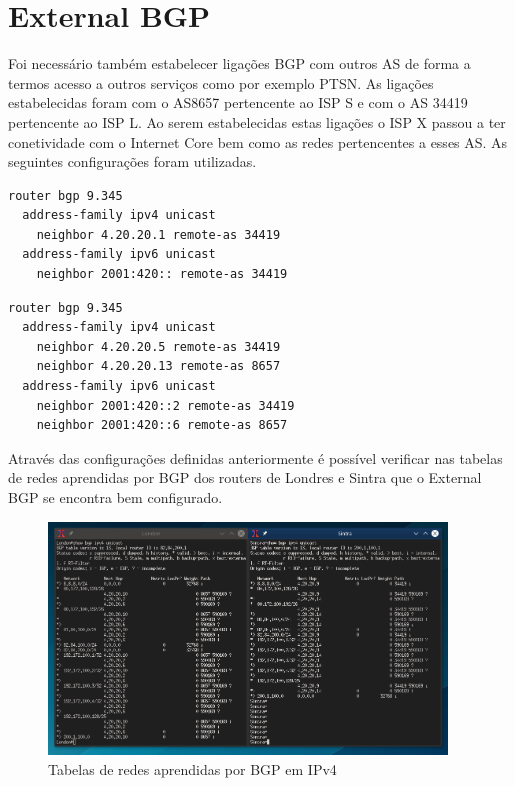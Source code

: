 \documentclass[11pt,a4paper]{report}
\begin{document}
\section{External BGP}
Foi necessário também estabelecer ligações BGP com outros AS de forma a termos acesso a outros serviços como por exemplo PTSN. As ligações estabelecidas foram com o AS8657 pertencente ao ISP S e com o AS 34419 pertencente ao ISP L. Ao serem estabelecidas estas ligações o ISP X passou a ter conetividade com o Internet Core bem como as redes pertencentes a esses AS. As seguintes configurações foram utilizadas.

\begin{lstlisting}[caption=External BGP - Router Porto]
router bgp 9.345
  address-family ipv4 unicast
  	neighbor 4.20.20.1 remote-as 34419
  address-family ipv6 unicast
  	neighbor 2001:420:: remote-as 34419
\end{lstlisting}

\begin{lstlisting}[caption=External BGP - Router Lisboa]
router bgp 9.345
  address-family ipv4 unicast
  	neighbor 4.20.20.5 remote-as 34419
	neighbor 4.20.20.13 remote-as 8657
  address-family ipv6 unicast
  	neighbor 2001:420::2 remote-as 34419
 	neighbor 2001:420::6 remote-as 8657
\end{lstlisting}

Através das configurações definidas anteriormente é possível verificar nas tabelas de redes aprendidas por BGP dos routers de Londres e Sintra que o External BGP se encontra bem configurado.

\begin{figure}[H]
\centerline{\includegraphics[width=300pt]{private_as_removal_ipv4.png}}
\caption{Tabelas de redes aprendidas por BGP em IPv4}
\label{schema}
\end{figure}
\end{document}
